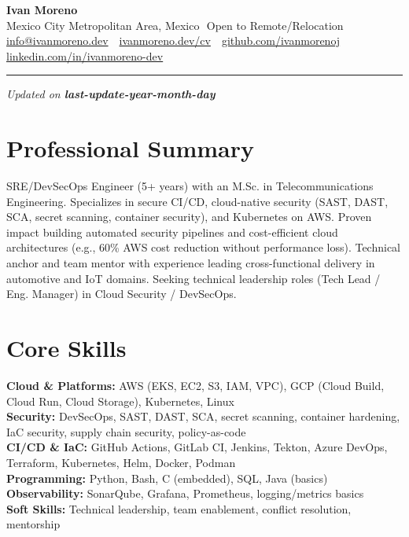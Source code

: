 \documentclass[11pt,a4paper]{article}
\newcommand{\sep}{\,\textbar\,}
\newcommand{\skillcat}[2]{\textbf{#1:} #2\\}
\begin{document}
{\LARGE \textbf{Ivan Moreno}}\\[2pt]
\small Mexico City Metropolitan Area, Mexico \sep Open to Remote/Relocation\\
\small \href{mailto:info@ivanmoreno.dev}{info@ivanmoreno.dev} \sep 
\href{https://ivanmoreno.dev/cv}{ivanmoreno.dev/cv} \sep 
\href{https://github.com/ivanmorenoj}{github.com/ivanmorenoj} \sep 
\href{https://www.linkedin.com/in/ivanmoreno-dev}{linkedin.com/in/ivanmoreno-dev}

\vspace{6pt}
\hrule
\vspace{6pt}

\vspace{-18pt} \null \hfill {\tiny \textit{Updated on \textbf{last-update-year-month-day}}}

\section*{Professional Summary}
SRE/DevSecOps Engineer (5+ years) with an M.Sc. in Telecommunications Engineering. Specializes in secure CI/CD, cloud-native security (SAST, DAST, SCA, secret scanning, container security), and Kubernetes on AWS. Proven impact building automated security pipelines and cost-efficient cloud architectures (e.g., 60\% AWS cost reduction without performance loss). Technical anchor and team mentor with experience leading cross-functional delivery in automotive and IoT domains. Seeking technical leadership roles (Tech Lead / Eng. Manager) in Cloud Security / DevSecOps.

\section*{Core Skills}
\skillcat{Cloud \& Platforms}{AWS (EKS, EC2, S3, IAM, VPC), GCP (Cloud Build, Cloud Run, Cloud Storage), Kubernetes, Linux}
\skillcat{Security}{DevSecOps, SAST, DAST, SCA, secret scanning, container hardening, IaC security, supply chain security, policy-as-code}
\skillcat{CI/CD \& IaC}{GitHub Actions, GitLab CI, Jenkins, Tekton, Azure DevOps, Terraform, Kubernetes, Helm, Docker, Podman}
\skillcat{Programming}{Python, Bash, C (embedded), SQL, Java (basics)}
\skillcat{Observability}{SonarQube, Grafana, Prometheus, logging/metrics basics}
\skillcat{Soft Skills}{Technical leadership, team enablement, conflict resolution, mentorship}
\end{document}
